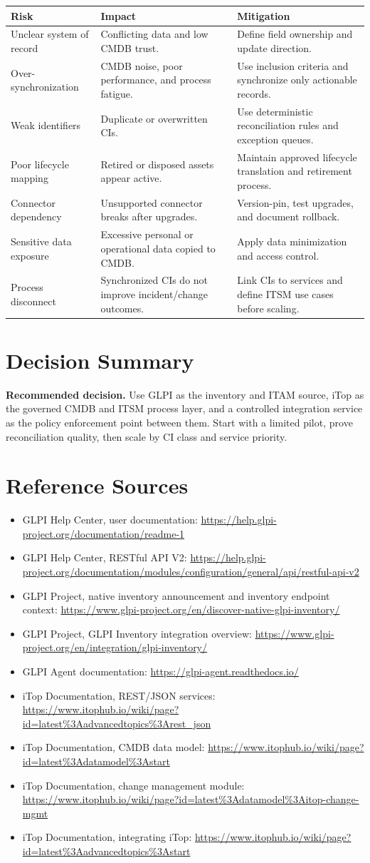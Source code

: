 \documentclass[11pt]{article}
\newcommand{\sourcesection}{%
\section*{Reference Sources}
\small
\begin{itemize}
  \item GLPI Help Center, user documentation: \url{https://help.glpi-project.org/documentation/readme-1}
  \item GLPI Help Center, RESTful API V2: \url{https://help.glpi-project.org/documentation/modules/configuration/general/api/restful-api-v2}
  \item GLPI Project, native inventory announcement and inventory endpoint context: \url{https://www.glpi-project.org/en/discover-native-glpi-inventory/}
  \item GLPI Project, GLPI Inventory integration overview: \url{https://www.glpi-project.org/en/integration/glpi-inventory/}
  \item GLPI Agent documentation: \url{https://glpi-agent.readthedocs.io/}
  \item iTop Documentation, REST/JSON services: \url{https://www.itophub.io/wiki/page?id=latest\%3Aadvancedtopics\%3Arest_json}
  \item iTop Documentation, CMDB data model: \url{https://www.itophub.io/wiki/page?id=latest\%3Adatamodel\%3Astart}
  \item iTop Documentation, change management module: \url{https://www.itophub.io/wiki/page?id=latest\%3Adatamodel\%3Aitop-change-mgmt}
  \item iTop Documentation, integrating iTop: \url{https://www.itophub.io/wiki/page?id=latest\%3Aadvancedtopics\%3Astart}
\end{itemize}
\normalsize
}
\begin{document}
\begin{longtable}{>{\raggedright\arraybackslash}p{\dimexpr 0.31111\dimexpr\linewidth-6\tabcolsep\relax\relax}>{\raggedright\arraybackslash}p{\dimexpr 0.35556\dimexpr\linewidth-6\tabcolsep\relax\relax}>{\raggedright\arraybackslash}p{\dimexpr 0.33333\dimexpr\linewidth-6\tabcolsep\relax\relax}}
\toprule
\rowcolor{LightBlue}\textbf{Risk} & \textbf{Impact} & \textbf{Mitigation} \\
\midrule
Unclear system of record & Conflicting data and low CMDB trust. & Define field ownership and update direction. \\
Over-synchronization & CMDB noise, poor performance, and process fatigue. & Use inclusion criteria and synchronize only actionable records. \\
Weak identifiers & Duplicate or overwritten CIs. & Use deterministic reconciliation rules and exception queues. \\
Poor lifecycle mapping & Retired or disposed assets appear active. & Maintain approved lifecycle translation and retirement process. \\
Connector dependency & Unsupported connector breaks after upgrades. & Version-pin, test upgrades, and document rollback. \\
Sensitive data exposure & Excessive personal or operational data copied to CMDB. & Apply data minimization and access control. \\
Process disconnect & Synchronized CIs do not improve incident/change outcomes. & Link CIs to services and define ITSM use cases before scaling. \\
\bottomrule
\end{longtable}

\section{Decision Summary}

\begin{calloutbox}
\textbf{Recommended decision.} Use GLPI as the inventory and ITAM source, iTop as the governed CMDB and ITSM process layer, and a controlled integration service as the policy enforcement point between them. Start with a limited pilot, prove reconciliation quality, then scale by CI class and service priority.
\end{calloutbox}

\sourcesection
\end{document}

